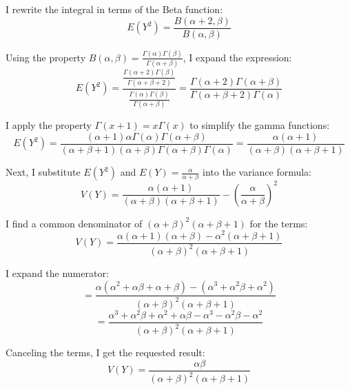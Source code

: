 \documentclass[12pt]{article}
\begin{document}
I rewrite the integral in terms of the Beta function:
$$E(Y^2) = \frac{B(\alpha+2, \beta)}{B(\alpha,\beta)}$$

Using the property $B(\alpha,\beta) = \frac{\Gamma(\alpha)\Gamma(\beta)}{\Gamma(\alpha+\beta)}$, I expand the expression:
$$E(Y^2) = \frac{\frac{\Gamma(\alpha+2)\Gamma(\beta)}{\Gamma(\alpha+\beta+2)}}{\frac{\Gamma(\alpha)\Gamma(\beta)}{\Gamma(\alpha+\beta)}} = \frac{\Gamma(\alpha+2)\Gamma(\alpha+\beta)}{\Gamma(\alpha+\beta+2)\Gamma(\alpha)}$$

I apply the property $\Gamma(x+1) = x\Gamma(x)$ to simplify the gamma functions:
$$E(Y^2) = \frac{(\alpha+1)\alpha\Gamma(\alpha)\Gamma(\alpha+\beta)}{(\alpha+\beta+1)(\alpha+\beta)\Gamma(\alpha+\beta)\Gamma(\alpha)} = \frac{\alpha(\alpha+1)}{(\alpha+\beta)(\alpha+\beta+1)}$$

Next, I substitute $E(Y^2)$ and $E(Y) = \frac{\alpha}{\alpha+\beta}$ into the variance formula:
$$V(Y) = \frac{\alpha(\alpha+1)}{(\alpha+\beta)(\alpha+\beta+1)} - \left( \frac{\alpha}{\alpha+\beta} \right)^2$$

I find a common denominator of $(\alpha+\beta)^2(\alpha+\beta+1)$ for the terms:
$$V(Y) = \frac{\alpha(\alpha+1)(\alpha+\beta) - \alpha^2(\alpha+\beta+1)}{(\alpha+\beta)^2(\alpha+\beta+1)}$$

I expand the numerator:
$$= \frac{\alpha(\alpha^2 + \alpha\beta + \alpha + \beta) - (\alpha^3 + \alpha^2\beta + \alpha^2)}{(\alpha+\beta)^2(\alpha+\beta+1)}$$
$$= \frac{\alpha^3 + \alpha^2\beta + \alpha^2 + \alpha\beta - \alpha^3 - \alpha^2\beta - \alpha^2}{(\alpha+\beta)^2(\alpha+\beta+1)}$$

Canceling the terms, I get the requested result:
$$V(Y) = \frac{\alpha\beta}{(\alpha+\beta)^2(\alpha+\beta+1)}$$
\end{document}
